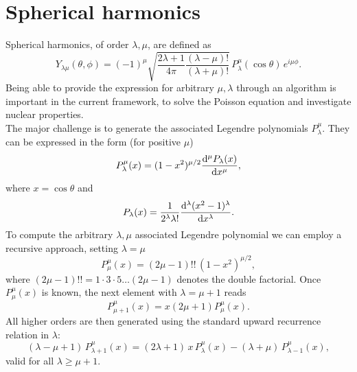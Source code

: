 \section{Spherical harmonics}
Spherical harmonics, of order $\lambda, \mu$, are defined as
\begin{equation}
    Y_{\lambda\mu} (\theta, \phi) = (-1)^\mu 
    \sqrt{\frac{2\lambda + 1}{4\pi}\frac{(\lambda-\mu)!}{(\lambda+\mu)!}}
    \, P_\lambda^\mu(\cos\theta) \, e^{i\mu\phi}.
\end{equation}
Being able to provide the expression for arbitrary $\mu, \lambda$ through an algorithm 
is important in the current framework, to solve the Poisson equation and investigate 
nuclear properties.
\\The major challenge is to generate the associated Legendre polynomials $P_\lambda^\mu$.
They can be expressed in the form (for positive $\mu$)
\begin{equation}
    P_\lambda^\mu(x) = (1-x^2)^{\mu/2} \dv[\mu]{P_\lambda(x)}{x},
\end{equation}
where $x = \cos\theta$ and
\begin{equation}
    P_\lambda(x) = \frac 1 {2^\lambda \lambda !}
    \dv[\lambda]{(x^2-1)^\lambda}{x}.
\end{equation}
To compute the arbitrary $\lambda, \mu$ associated Legendre polynomial we can employ a recursive approach, setting $\lambda =\mu$
\begin{equation}
    P_\mu^\mu(x) = (2\mu-1)!! \, (1-x^2)^{\mu/2},
\end{equation}
where $(2\mu-1)!! = 1\cdot 3 \cdot 5 \ldots (2\mu-1)$ denotes the double factorial.
Once $P_\mu^\mu(x)$ is known, the next element with $\lambda = \mu +1$ reads
\begin{equation}
    P_{\mu+1}^\mu(x) = x(2\mu+1)P_\mu^\mu(x).
\end{equation}
All higher orders are then generated using the standard upward recurrence relation in $\lambda$:
\begin{equation}
    (\lambda - \mu + 1) \, P_{\lambda+1}^\mu(x) =
    (2\lambda + 1) \, x \, P_\lambda^\mu(x) -
    (\lambda + \mu) \, P_{\lambda-1}^\mu(x),
\end{equation}
valid for all $\lambda \geq \mu+1$.  

